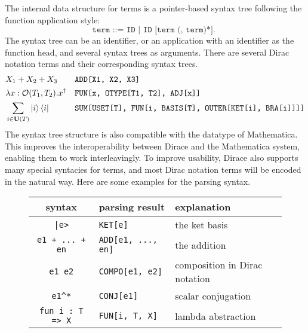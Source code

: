 \documentclass[runningheads]{llncs}
\begin{document}


The internal data structure for terms is a pointer-based syntax tree following the function application style:
\[
    \texttt{
        term ::= ID | ID [term (, term)*].
    }
\]
The syntax tree can be an identifier, or an application with an identifier as the function head, and several syntax trees as arguments. There are several Dirac notation terms and their corresponding syntax trees.
\footnotesize{
\begin{align*}
    & X_1 + X_2 + X_3 && \texttt{ADD[X1, X2, X3]} 
    \\
    & \lambda x: \mathcal{O}(T_1,  T_2). x^\dagger && \texttt{FUN[x, OTYPE[T1, T2], ADJ[x]]}
    \\
    & \sum_{i \in \mathbf{U}(T)} \ket{i} \bra{i} && \texttt{SUM[USET[T], FUN[i, BASIS[T], OUTER[KET[i], BRA[i]]]]}
\end{align*}
}
The syntax tree structure is also compatible with the datatype of Mathematica. This improves the interoperability between Dirace and the Mathematica system, enabling them to work interleavingly.
To improve usability, Dirace also supports many special syntacies for terms,  and most Dirac notation terms will be encoded in the natural way.
Here are some examples for the parsing syntax.

\begin{figure}
    \center
\begin{tabular}{c >{\centering\arraybackslash}p{4cm} l}
    \hline
    syntax & parsing result & explanation \\
    \hline
    \texttt{|e>} & \texttt{KET[e]} & the ket basis\\
    \texttt{e1 + ... + en} & \texttt{ADD[e1, ..., en]} & the addition\\
    \texttt{e1\ e2} & \texttt{COMPO[e1, e2]} & composition in Dirac notation \\
    \texttt{e1\^{}*} & \texttt{CONJ[e1]} & scalar conjugation \\
    \texttt{fun i : T => X} & \texttt{FUN[i, T, X]} & lambda abstraction \\
    \hline
\end{tabular}
\end{figure}
\end{document}
